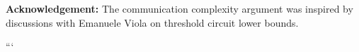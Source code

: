 \vspace{1em}






\noindent






\textbf{Acknowledgement:} The communication complexity argument was inspired by discussions with Emanuele Viola on threshold circuit lower bounds.



































































```













